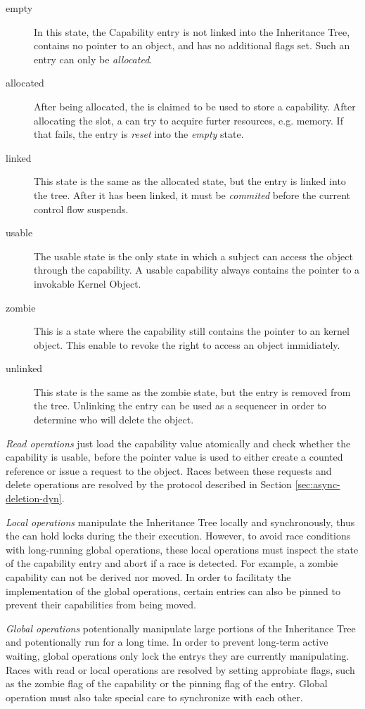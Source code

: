 \begin{description}
\item[empty] In this state, the Capability entry is not linked into the Inheritance Tree, contains no pointer to an object, and has no additional flags set. Such an entry can only be \emph{allocated}.
\item[allocated] After being allocated, the is claimed to be used to store a capability. After allocating the slot, a can try to acquire furter resources, e.g. memory. If that fails, the entry is \emph{reset} into the \emph{empty} state.
\item[linked] This state is the same as the allocated state, but the entry is linked into the tree. After it has been linked, it must be \emph{commited} before the current control flow suspends.
\item[usable] The usable state is the only state in which a subject can access the object through the capability. A usable capability always contains the pointer to a invokable Kernel Object.
\item[zombie] This is a state where the capability still contains the pointer to an kernel object. This enable to revoke the right to access an object immidiately.
\item[unlinked] This state is the same as the zombie state, but the entry is removed from the tree. Unlinking the entry can be used as a sequencer in order to determine who will delete the object.
\end{description}

\emph{Read operations} just load the capability value atomically and check whether the capability is usable, before the pointer value is used to either create a counted reference or issue a request to the object. Races between these requests and delete operations are resolved by the protocol described in Section \ref{sec:async-deletion-dyn}.

\emph{Local operations} manipulate the Inheritance Tree locally and synchronously, thus the can hold locks during the their execution. However, to avoid race conditions with long-running global operations, these local operations must inspect the state of the capability entry and abort if a race is detected. For example, a zombie capability can not be derived nor moved. In order to facilitaty the implementation of the global operations, certain entries can also be pinned to prevent their capabilities from being moved.

\emph{Global operations} potentionally manipulate large portions of the Inheritance Tree and potentionally run for a long time. In order to prevent long-term active waiting, global operations only lock the entrys they are currently manipulating. Races with read or local operations are resolved by setting approbiate flags, such as the zombie flag of the capability or the pinning flag of the entry. Global operation must also take special care to synchronize with each other.


